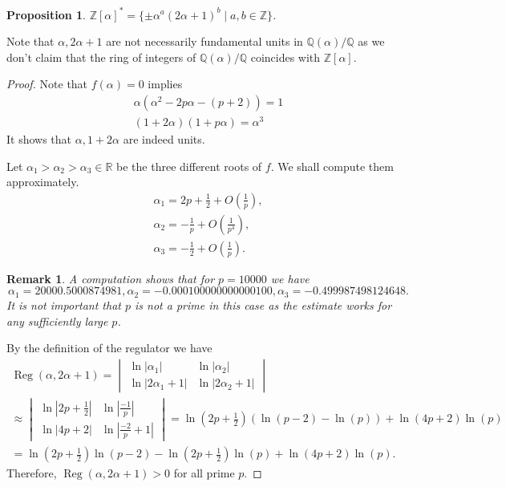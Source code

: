\documentclass[a4paper]{article}
\newtheorem{Prop}[Thm]{Proposition}
\newtheorem{Rem}[Thm]{Remark}
\newcommand{\R}{\mathbb{R}}        %
\newcommand{\Q}{\mathbb{Q}}        %
\DeclareMathOperator{\Reg}{Reg}        %
\begin{document}
\begin{Prop}
	\label{prop_multiplicative_group_structure}
$\mathbb{Z}[\alpha]^{*} = \{ \pm \alpha^a (2\alpha + 1)^b \mid a, b \in \mathbb{Z} \} $.
\end{Prop}
Note that $\alpha, 2\alpha + 1$ are not necessarily fundamental units in $\Q(\alpha)/\Q$ as we don't claim that the ring of integers of $\Q(\alpha) / \Q$ coincides with $\mathbb{Z}[\alpha]$.
\begin{proof}
Note that $f(\alpha) = 0$ implies 
\begin{gather}
\alpha (\alpha^2 - 2p \alpha - (p + 2)) = 1
\\
\label{equation_units}
(1 + 2 \alpha) (1 + p \alpha) = \alpha^3
\end{gather}
It shows that $\alpha, 1 + 2 \alpha$ are indeed units.

Let $\alpha_1 > \alpha_2 > \alpha_3 \in \R$ be the three different roots of $f$.
We shall compute them approximately.
\begin{gather*}
\alpha_1 = 2 p + \frac{1}{2} + O\left(\frac{1}{p}\right), \\
\alpha_2 = - \frac{1}{ p } + O\left(\frac{1}{p^4}\right), \\
\alpha_3 = - \frac{1}{2} + O\left(\frac{1}{p}\right)
.\end{gather*}
\begin{Rem}




A computation shows that for $p = 10000$
we have
 \[
\alpha_1 = 20000.5000874981 ,
\alpha_2 = -0.000100000000000100 ,
\alpha_3 = -0.499987498124648 
.\] 
It is not important that $p$ is not a prime in this case as the estimate works for any sufficiently large $p$.
\end{Rem}

By the definition of the regulator we have
\begin{multline}
\Reg(\alpha, 2\alpha + 1) = 
\begin{vmatrix}
\ln |\alpha_1| 		& \ln |\alpha_2| \\
\ln |2 \alpha_1 + 1| 	& \ln |2 \alpha_2 + 1|
\end{vmatrix} 
\\
\approx
\begin{vmatrix}
\ln |2p + \frac{1}{2}| 	& \ln |\frac{-1}{p}| \\
\ln |4 p + 2| 	& \ln |\frac{-2}{p} + 1|
\end{vmatrix}
=
\ln(2p + \frac{1}{2})
(\ln(p - 2) - \ln(p))
+
\ln(4p + 2) \ln(p)
\\
=
\ln(2 p + \frac{1}{2}) \ln(p - 2) - \ln(2 p + \frac{1}{2}) \ln(p) + \ln(4p + 2) \ln(p)
.\end{multline}
Therefore, $\Reg(\alpha, 2\alpha + 1) > 0 $ for all prime $p$.


\end{proof}
\end{document}
